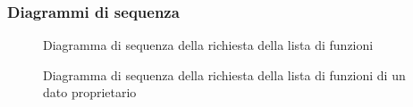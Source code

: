 \subsubsection{Diagrammi di sequenza}
\begin{figure}[H]
	\noindent
	\caption{Diagramma di sequenza della richiesta della lista di funzioni}
\end{figure}

\begin{figure}[H]
	\noindent
	\caption{Diagramma di sequenza della richiesta della lista di funzioni di un dato proprietario}
\end{figure}

